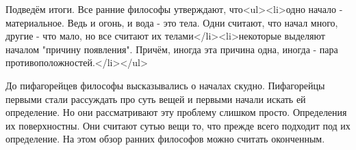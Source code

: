 \documentclass{article}
\begin{document}
Подведём итоги. Все ранние философы утверждают, что<ul><li>одно начало - материальное. Ведь и огонь, и вода - это тела. Одни считают, что начал много, другие - что мало, но все считают их телами</li><li>некоторые выделяют началом "причину появления". Причём, иногда эта причина одна, иногда - пара противоположностей.</li></ul>

До пифагорейцев философы высказывались о началах скудно. Пифагорейцы первыми стали рассуждать про суть вещей и первыми начали искать ей определение. Но они рассматривают эту проблему слишком просто. Определения их поверхностны. Они считают сутью вещи то, что прежде всего подходит под их определение. На этом обзор ранних философов можно считать оконченным.
\end{document}

